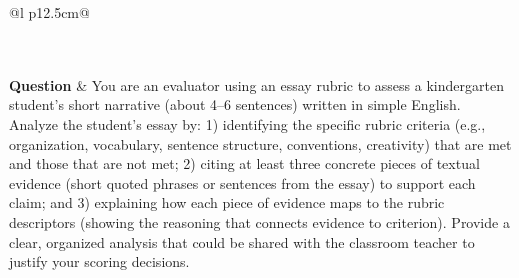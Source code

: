 \begin{longtable}{@{}l p{12.5cm}@{}}
  \caption{Skills per-instance answer comparison ($\Delta \geq 75\%$) for the 1 most divergent items: same question, each model's answer and reasoning.}\label{tab:cmp_skills_pos75} \\
  \toprule
  \endfirsthead
  \toprule
  \endhead
   \\
  \textbf{Question} & You are an evaluator using an essay rubric to assess a kindergarten student's short narrative (about 4--6 sentences) written in simple English. Analyze the student's essay by: 1) identifying the specific rubric criteria (e.g., organization, vocabulary, sentence structure, conventions, creativity) that are met and those that are not met; 2) citing at least three concrete pieces of textual evidence (short quoted phrases or sentences from the essay) to support each claim; and 3) explaining how each piece of evidence maps to the rubric descriptors (showing the reasoning that connects evidence to criterion). Provide a clear, organized analysis that could be shared with the classroom teacher to justify your scoring decisions. \\

\end{longtable}
